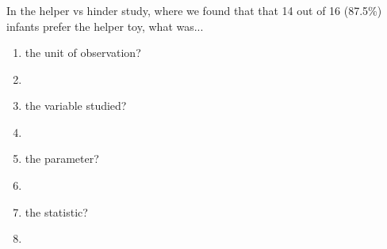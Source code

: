 \begin{frame}
\frametitle{\grp}
\begin{clicker}{In the helper vs hinder study, where we found that that 14 out of 16 (87.5\%) infants prefer the helper toy, what was...}
\begin{enumerate}
    \item
    the unit of observation?
    \item[]
    \item
    the variable studied?
    \item[]
    \item
    the parameter?
    \item[]
    \item
    the statistic?
    \item[]
    \end{enumerate}
\end{clicker}
\end{frame}






 